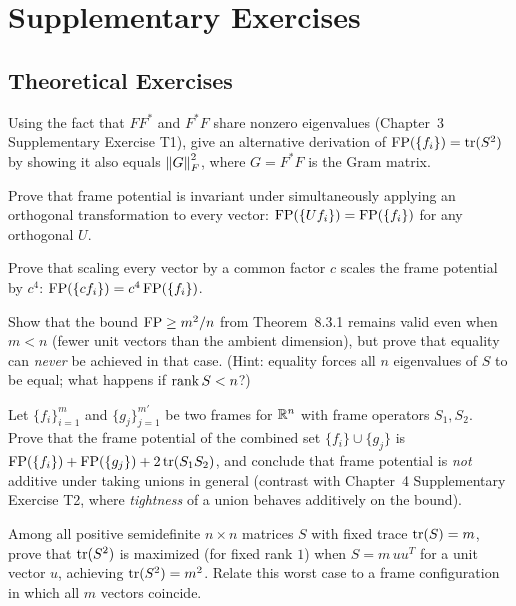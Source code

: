 \section{Supplementary Exercises}
\label{sec:extra-ch8}

\subsection*{Theoretical Exercises}
\begin{theoexercises}
	\item Using the fact that $FF^*$ and $F^*F$ share nonzero eigenvalues
	(Chapter~3 Supplementary Exercise T1), give an alternative
	derivation of $\operatorname{FP}(\{f_i\})=\operatorname{tr}(S^2)$ by showing it also equals
	$\left\| G \right\|_F^2$, where $G=F^*F$ is the Gram matrix.
	
	\item Prove that frame potential is invariant under simultaneously
	applying an orthogonal transformation to every vector:
	$\operatorname{FP}(\{Uf_i\})=\operatorname{FP}(\{f_i\})$ for any orthogonal $U$.
	
	\item Prove that scaling every vector by a common factor $c$ scales the
	frame potential by $c^4$: $\operatorname{FP}(\{cf_i\})=c^4\operatorname{FP}(\{f_i\})$.
	
	\item Show that the bound $\operatorname{FP}\ge m^2/n$ from Theorem~8.3.1 remains
	valid even when $m<n$ (fewer unit vectors than the ambient
	dimension), but prove that equality can \emph{never} be achieved
	in that case. (Hint: equality forces all $n$ eigenvalues of $S$
	to be equal; what happens if $\operatorname{rank} S<n$?)
	
	\item Let $\{f_i\}_{i=1}^m$ and $\{g_j\}_{j=1}^{m'}$ be two frames for
	$\mathbb{R}^n$ with frame operators $S_1,S_2$. Prove that the frame
	potential of the combined set $\{f_i\}\cup\{g_j\}$ is
	$\operatorname{FP}(\{f_i\})+\operatorname{FP}(\{g_j\})+2\operatorname{tr}(S_1S_2)$, and conclude that frame
	potential is \emph{not} additive under taking unions in general
	(contrast with Chapter~4 Supplementary Exercise T2, where
	\emph{tightness} of a union behaves additively on the bound).
	
	\item Among all positive semidefinite $n\times n$ matrices $S$ with
	fixed trace $\operatorname{tr}(S)=m$, prove that $\operatorname{tr}(S^2)$ is maximized (for
	fixed rank $1$) when $S=m\,uu^T$ for a unit vector $u$, achieving
	$\operatorname{tr}(S^2)=m^2$. Relate this worst case to a frame configuration
	in which all $m$ vectors coincide.
\end{theoexercises}

